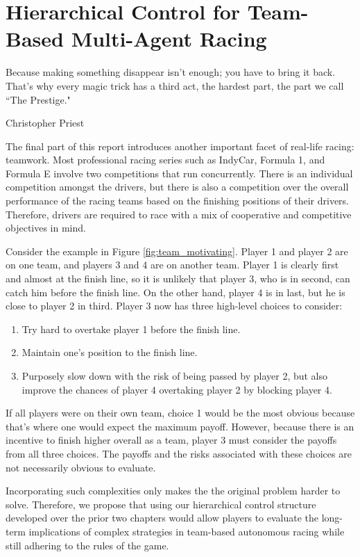 \chapter{Hierarchical Control for Team-Based Multi-Agent Racing}
\epigraph{\flushright Because making something disappear isn't enough; you have to bring it back. That's why every magic trick has a third act, the hardest part, the part we call ``The Prestige."}{Christopher Priest}
\label{chapter:team}
The final part of this report introduces another important facet of real-life racing: teamwork. Most professional racing series such as IndyCar, Formula 1, and Formula E involve two competitions that run concurrently. There is an individual competition amongst the drivers, but there is also a competition over the overall performance of the racing teams based on the finishing positions of their drivers. Therefore, drivers are required to race with a mix of cooperative and competitive objectives in mind. 

Consider the example in Figure \ref{fig:team_motivating}. Player 1 and player 2 are on one team, and players 3 and 4 are on another team. Player 1 is clearly first and almost at the finish line, so it is unlikely that player 3, who is in second, can catch him before the finish line. On the other hand, player 4 is in last, but he is close to player 2 in third. Player 3 now has three high-level choices to consider:
\begin{enumerate}
    \item Try hard to overtake player 1 before the finish line.
    \item Maintain one's position to the finish line.
    \item Purposely slow down with the risk of being passed by player 2, but also improve the chances of player 4 overtaking player 2 by blocking player 4.
\end{enumerate}
If all players were on their own team, choice 1 would be the most obvious because that's where one would expect the maximum payoff. However, because there is an incentive to finish higher overall as a team, player 3 must consider the payoffs from all three choices. The payoffs and the risks associated with these choices are not necessarily obvious to evaluate. 

Incorporating such complexities only makes the the original problem harder to solve. Therefore, we propose that using our hierarchical control structure developed over the prior two chapters would allow players to evaluate the long-term implications of complex strategies in team-based autonomous racing while still adhering to the rules of the game. 

